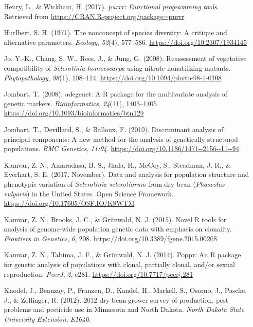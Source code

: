 \documentclass[fleqn,10pt,lineno]{wlpeerj} %
\theoremstyle{definition}
\theoremstyle{definition}
\theoremstyle{definition}
\theoremstyle{remark}
\begin{document}
\hypertarget{ref-purrr}{}
Henry, L., \& Wickham, H. (2017). \emph{purrr: Functional programming
tools}. Retrieved from \url{https://CRAN.R-project.org/package=purrr}

\hypertarget{ref-hurlbert1971nonconcept}{}
Hurlbert, S. H. (1971). The nonconcept of species diversity: A critique
and alternative parameters. \emph{Ecology}, \emph{52}(4), 577--586.
\url{https://doi.org/10.2307/1934145}

\hypertarget{ref-jo2008reassessment}{}
Jo, Y.-K., Chang, S. W., Rees, J., \& Jung, G. (2008). Reassessment of
vegetative compatibility of \emph{Sclerotinia homoeocarpa} using
nitrate-nonutilizing mutants. \emph{Phytopathology}, \emph{98}(1),
108--114. \url{https://doi.org/10.1094/phyto-98-1-0108}

\hypertarget{ref-jombart2008adegenet}{}
Jombart, T. (2008). adegenet: A R package for the multivariate analysis
of genetic markers. \emph{Bioinformatics}, \emph{24}(11), 1403--1405.
\url{https://doi.org/10.1093/bioinformatics/btn129}

\hypertarget{ref-jombart2010discriminant}{}
Jombart, T., Devillard, S., \& Balloux, F. (2010). Discriminant analysis
of principal components: A new method for the analysis of genetically
structured populations. \emph{BMC Genetics}, \emph{11:94}.
\url{https://doi.org/10.1186/1471--2156--11--94}

\hypertarget{ref-kamvar2017data}{}
Kamvar, Z. N., Amaradasa, B. S., Jhala, R., McCoy, S., Steadman, J. R.,
\& Everhart, S. E. (2017, November). Data and analysis for population
structure and phenotypic variation of \emph{Sclerotinia sclerotiorum}
from dry bean (\emph{Phaseolus vulgaris}) in the United States. Open
Science Framework. \url{https://doi.org/10.17605/OSF.IO/K8WTM}

\hypertarget{ref-kamvar2015novel}{}
Kamvar, Z. N., Brooks, J. C., \& Grünwald, N. J. (2015). Novel R tools
for analysis of genome-wide population genetic data with emphasis on
clonality. \emph{Frontiers in Genetics}, \emph{6}, 208.
\url{https://doi.org/10.3389/fgene.2015.00208}

\hypertarget{ref-kamvar2014poppr}{}
Kamvar, Z. N., Tabima, J. F., \& Grünwald, N. J. (2014). Poppr: An R
package for genetic analysis of populations with clonal, partially
clonal, and/or sexual reproduction. \emph{PeerJ}, \emph{2}, e281.
\url{https://doi.org/10.7717/peerj.281}

\hypertarget{ref-knodel2012dry}{}
Knodel, J., Beauzay, P., Franzen, D., Kandel, H., Markell, S., Osorno,
J., Pasche, J., \& Zollinger, R. (2012). 2012 dry bean grower survey of
production, pest problems and pesticide use in Minnesota and North
Dakota. \emph{North Dakota State University Extension}, \emph{E1640}.
\end{document}
